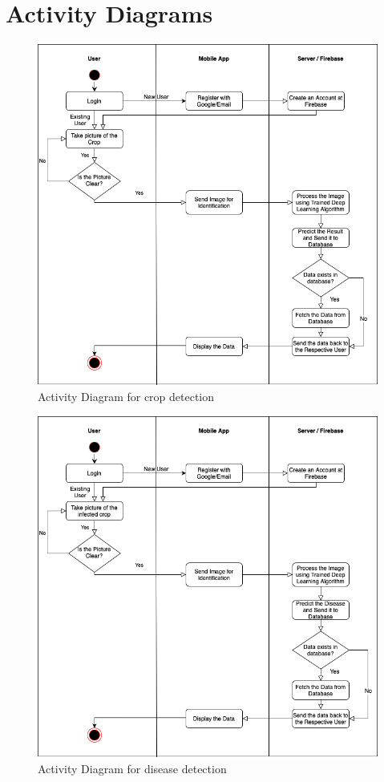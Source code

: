 \documentclass[../Report.tex]{subfiles}
\begin{document}
\section{Activity Diagrams}
\begin{figure}[H]
    \includegraphics[width=\linewidth]{images/activity_crop.png}
    \caption{Activity Diagram for crop detection}
    \label{fig:activity_1}
\end{figure}

\begin{figure}[H]
    \includegraphics[width=\linewidth]{images/activity_disease.png}
    \caption{Activity Diagram for disease detection}
    \label{fig:activity_2}
\end{figure}
\end{document}
